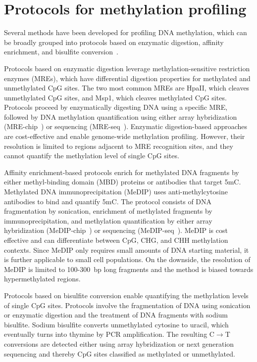 \section{Protocols for methylation profiling} \label{sec:intro_proto}

Several methods have been developed for profiling DNA methylation, which can be broadly grouped into protocols based on enzymatic digestion, affinity enrichment, and bisulfite conversion~\citep{yong_profiling_2016,schwartzman_single-cell_2015,plongthongkum_advances_2014,huang_profiling_2010,laird_principles_2010-1}.

Protocols based on enzymatic digestion leverage methylation-sensitive restriction enzymes (MREs), which have differential digestion properties for methylated and unmethylated CpG sites. The two most common MREs are HpaII, which cleaves unmethylated CpG sites, and Msp1, which cleaves methylated CpG sites. Protocols proceed by enzymatically digesting DNA using a specific MRE, followed by DNA methylation quantification using either array hybridization (MRE-chip~\citep{chittur_help_2010}) or sequencing (MRE-seq~\citep{maunakea_conserved_2010}). Enzymatic digestion-based approaches are cost-effective and enable genome-wide methylation profiling. However, their resolution is limited to regions adjacent to MRE recognition sites, and they cannot quantify the methylation level of single CpG sites.

Affinity enrichment-based protocols enrich for methylated DNA fragments by either methyl-binding domain (MBD) proteins or antibodies that target 5mC. Methylated DNA immunoprecipitation (MeDIP) uses anti-methylcytosine antibodies to bind and quantify 5mC. The protocol consists of DNA fragmentation by sonication, enrichment of methylated fragments by immunoprecipitation, and methylation quantification by either array hybridization (MeDIP-chip~\citep{park-sarge_methylated_2009}) or sequencing (MeDIP-seq~\citep{brinkman_whole-genome_2010}). MeDIP is cost effective and can differentiate between CpG, CHG, and CHH methylation contexts. Since MeDIP only requires small amounts of DNA starting material, it is further applicable to small cell populations. On the downside, the resolution of MeDIP is limited to 100-300~bp long fragments and the method is biased towards hypermethylated regions.

Protocols based on bisulfite conversion enable quantifying the methylation levels of single CpG sites. Protocols involve the fragmentation of DNA using sonication or enzymatic digestion and the treatment of DNA fragments with sodium bisulfite. Sodium bisulfite converts unmethylated cytosine to uracil, which eventually turns into thymine by PCR amplification. The resulting C$\rightarrow$T conversions are detected either using array hybridization or next generation sequencing and thereby CpG sites classified as methylated or unmethylated.

